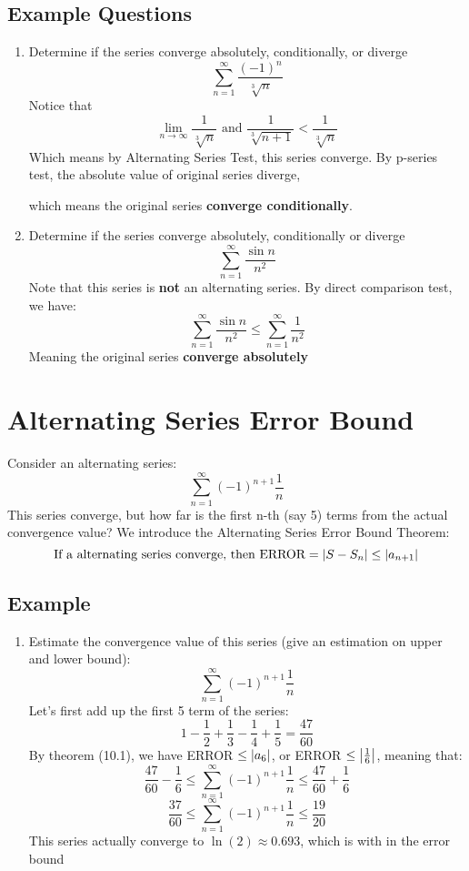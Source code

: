 \documentclass{article}
\numberwithin{equation}{section}
\begin{document}
\subsection{Example Questions}
\begin{enumerate}
    \item Determine if the series converge absolutely, conditionally, or diverge
    \[
    \sum_{n = 1}^{\infty} \frac{(-1)^n}{\sqrt[3]{n}}
    \]
    Notice that 
    \[
    \lim_{n\to\infty} \frac{1}{\sqrt[3]{n}} \text{ and } \frac{1}{\sqrt[3]{n + 1}} < \frac{1}{\sqrt[3]{n}}
    \]
    Which means by Alternating Series Test, this series converge. By p-series test, the absolute value of original series diverge,

    which means the original series \textbf{converge conditionally}.

    \item Determine if the series converge absolutely, conditionally or diverge
    \[
    \sum_{n = 1}^{\infty} \frac{\sin n}{n^2}
    \]
    Note that this series is \textbf{not} an alternating series. By direct comparison test, we have:
    \[
        \sum_{n = 1}^{\infty} \frac{\sin n}{n^2} \leq \sum_{n = 1}^{\infty} \frac{1}{n^2}
    \]
    Meaning the original series \textbf{converge absolutely}
\end{enumerate}

\newpage
\section{Alternating Series Error Bound}
Consider an alternating series:
\[
    \sum_{n = 1}^{\infty} (-1)^{n+1}\frac{1}{n}
\]
This series converge, but how far is the first n-th (say 5) terms from the actual convergence value? 
We introduce the Alternating Series Error Bound Theorem:
\begin{equation}
    \text{If a alternating series converge, then ERROR} = \abs{S - S_n} \leq \abs{a_{n+1}} 
\end{equation}

\subsection{Example}
\begin{enumerate}
    \item Estimate the convergence value of this series (give an estimation on upper and lower bound):
    \[
    \sum_{n = 1}^{\infty} (-1)^{n+1}\frac{1}{n}
    \]
    Let's first add up the first 5 term of the series:
    \[
        1 - \frac{1}{2} + \frac{1}{3} - \frac{1}{4} + \frac{1}{5} = \frac{47}{60}
    \]
    By theorem (10.1), we have ERROR $\leq \abs{a_6}$, or ERROR $\leq \abs{\frac{1}{6}}$, meaning that:
    \[
    \frac{47}{60} - \frac{1}{6} \leq \sum_{n = 1}^{\infty} (-1)^{n+1}\frac{1}{n} \leq \frac{47}{60} + \frac{1}{6}
    \]
    \[
        \frac{37}{60} \leq \sum_{n = 1}^{\infty} (-1)^{n+1}\frac{1}{n} \leq \frac{19}{20} 
    \]
    This series actually converge to $\ln(2) \approx 0.693$, which is with in the error bound
\end{enumerate}
\end{document}

